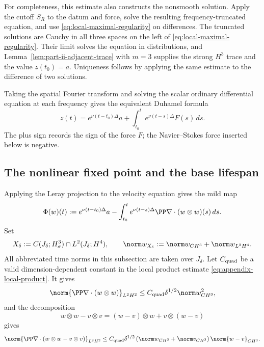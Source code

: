 For completeness, this estimate also constructs the nonsmooth solution.
Apply the cutoff \(S_R\) to the datum and force, solve the resulting frequency-truncated equation, and use \eqref{eq:local-maximal-regularity} on differences.
The truncated solutions are Cauchy in all three spaces on the left of \eqref{eq:local-maximal-regularity}.
Their limit solves the equation in distributions, and Lemma~\ref{lem:part-ii-adjacent-trace} with \(m=3\) supplies the strong \(H^3\) trace and the value \(z(t_0)=a\).
Uniqueness follows by applying the same estimate to the difference of two solutions.

Taking the spatial Fourier transform and solving the scalar ordinary differential equation at each frequency gives the equivalent Duhamel formula
\[
 z(t)=e^{\nu(t-t_0)\Delta}a
 +\int_{t_0}^{t}e^{\nu(t-s)\Delta}F(s)\,ds.
\]
The plus sign records the sign of the force \(F\); the Navier--Stokes force inserted below is negative.

\subsection{The nonlinear fixed point and the base lifespan}

Applying the Leray projection to the velocity equation gives the mild map
\begin{equation}
 \Phi(w)(t)
 :=e^{\nu(t-t_0)\Delta}a
 -\int_{t_0}^{t}e^{\nu(t-s)\Delta}
 \PP\nabla\cdot(w\otimes w)(s)\,ds.
 \label{eq:local-mild}
\end{equation}
Set
\[
 X_\delta
 :=C(J_\delta;H^3_\sigma)\cap L^2(J_\delta;H^4),
 \qquad
 \norm w_{X_\delta}
 :=\norm w_{C H^3}+\norm w_{L^2H^4}.
\]
All abbreviated time norms in this subsection are taken over \(J_\delta\).
Let \(C_{\rm quad}\) be a valid dimension-dependent constant in the local
product estimate \eqref{eq:appendix-local-product}.  It gives
\begin{equation}
 \norm{\PP\nabla\cdot(w\otimes w)}_{L^2H^2}
 \le C_{\rm quad}\delta^{1/2}\norm w_{C H^3}^2,
 \label{eq:local-index-count}
\end{equation}
and the decomposition
\[
 w\otimes w-v\otimes v
 =(w-v)\otimes w+v\otimes(w-v)
\]
gives
\begin{equation}
 \norm{\PP\nabla\cdot(w\otimes w-v\otimes v)}_{L^2H^2}
 \le C_{\rm quad}\delta^{1/2}
 \left(\norm w_{C H^3}+\norm v_{C H^3}\right)
 \norm{w-v}_{C H^3}.
 \label{eq:local-difference-count}
\end{equation}

